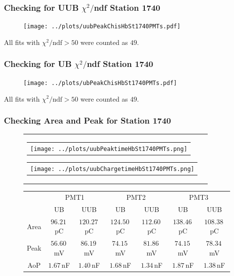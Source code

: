 \documentclass[aspectratio=169]{beamer}
\begin{document}
\begin{frame}
  \frametitle{Checking for UUB {\huge $\chi^2/$ndf} Station 1740}
  \begin{figure}
    \centering
    \texttt{[image: ../plots/uubPeakChisHbSt1740PMTs.pdf]}
  \end{figure}
  \footnotesize
  All fits with $\chi^2/\mathrm{ndf} > 50$ were counted as $49$.
\end{frame}

\begin{frame}
  \frametitle{Checking for UB {\huge $\chi^2/$ndf} Station 1740}
  \begin{figure}
    \centering
    \texttt{[image: ../plots/ubPeakChisHbSt1740PMTs.pdf]}
  \end{figure}
  \footnotesize
  All fits with $\chi^2/\mathrm{ndf} > 50$ were counted as $49$.
\end{frame}


\begin{frame}
  \frametitle{Checking Area and Peak for Station 1740}
  \begin{figure}
    \centering
    \begin{tabularx}{\textwidth}{CC}
      \begin{tabular}{l}
        \texttt{[image: ../plots/uubPeaktimeHbSt1740PMTs.png]}
      \end{tabular}
      \begin{tabular}{l}
        \texttt{[image: ../plots/uubChargetimeHbSt1740PMTs.png]}
      \end{tabular}
    \end{tabularx}
    \small
    \begin{tabular}{|c|c|c|c|c|c|c|}
      \hline
      \multirow{2}{*}{} & \multicolumn{2}{c|}{PMT1} & \multicolumn{2}{c|}{PMT2} & \multicolumn{2}{c|}{PMT3} \\ \cline{2-7}
      & UB & UUB & UB & UUB & UB & UUB \\ \hline
      Area & $96.21$\,pC  & $120.27$\,pC & $124.50$\,pC & $112.60$\,pC & $138.46$\,pC & $108.38$\,pC \\ \hline
      Peak & $56.60$\,mV  & $86.19$\,mV  & $74.15$\,mV  & $81.86$\,mV  & $74.15$\,mV  & $78.34$\, mV\\  \hline
      AoP  & $1.67$\,nF   & $1.40$\,nF   & $1.68$\,nF   & $1.34$\,nF   & $1.87$\,nF   & $1.38$\,nF \\ \hline
    \end{tabular}
  \end{figure}
\end{frame}
\end{document}
